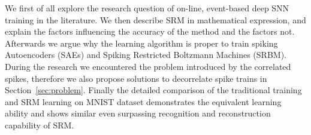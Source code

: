 We first of all explore the research question of on-line, event-based deep SNN training in the literature.
We then describe SRM in mathematical expression, and explain the factors influencing the accuracy of the method and the factors not. 
Afterwards we argue why the learning algorithm is proper to train spiking Autoencoders (SAEs) and Spiking Restricted Boltzmann Machines (SRBM).
During the research we encountered the problem introduced by the correlated spikes, therefore we also propose solutions to decorrelate spike trains in Section~\ref{sec:problem}. 
Finally the detailed comparison of the traditional training and SRM learning on MNIST dataset demonstrates the equivalent learning ability and shows similar even surpassing recognition and reconstruction capability of SRM.


